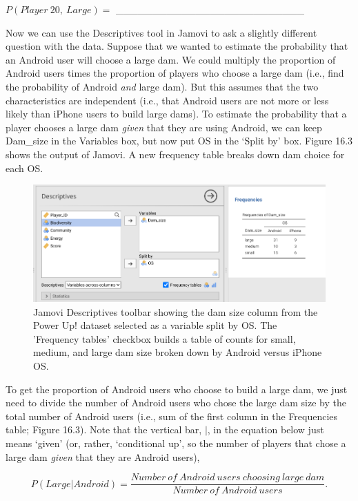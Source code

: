 \documentclass[
]{scrbook}
\begin{document}
\(P(Player\:20,\:Large) =\) \_\_\_\_\_\_\_\_\_\_\_\_\_\_\_\_\_\_\_\_\_\_\_\_\_\_

Now we can use the Descriptives tool in Jamovi to ask a slightly different question with the data.
Suppose that we wanted to estimate the probability that an Android user will choose a large dam.
We could multiply the proportion of Android users times the proportion of players who choose a large dam (i.e., find the probability of Android \emph{and} large dam).
But this assumes that the two characteristics are independent (i.e., that Android users are not more or less likely than iPhone users to build large dams).
To estimate the probability that a player chooses a large dam \emph{given} that they are using Android, we can keep Dam\_size in the Variables box, but now put OS in the `Split by' box.
Figure 16.3 shows the output of Jamovi.
A new frequency table breaks down dam choice for each OS.

\begin{figure}
\includegraphics[width=1\linewidth]{img/jamovi_power_up_frequencies2} \caption{Jamovi Descriptives toolbar showing the dam size column from the Power Up! dataset selected as a variable split by OS. The 'Frequency tables' checkbox builds a table of counts for small, medium, and large dam size broken down by Android versus iPhone OS.}\label{fig:unnamed-chunk-71}
\end{figure}

To get the proportion of Android users who choose to build a large dam, we just need to divide the number of Android users who chose the large dam size by the total number of Android users (i.e., sum of the first column in the Frequencies table; Figure 16.3).
Note that the vertical bar, \(|\), in the equation below just means `given' (or, rather, `conditional up', so the number of players that chose a large dam \emph{given} that they are Android users),

\[P(Large | Android) = \frac{Number\:of\:Android\:users\:choosing\:large\:dam}{Number\:of\:Android\:users}.\]
\end{document}
